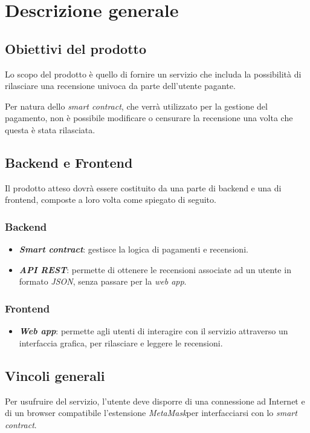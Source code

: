 \section{Descrizione generale}

    \subsection{Obiettivi del prodotto}
    Lo scopo del prodotto è quello di fornire un servizio che includa la possibilità di rilasciare una recensione univoca da parte dell'utente pagante.

    Per natura dello \textit{smart contract}\glo \:, che verrà utilizzato per la gestione del pagamento, non è possibile modificare o censurare la recensione una volta che questa è stata rilasciata.

    \subsection{Backend e Frontend}
    Il prodotto atteso dovrà essere costituito da una parte di backend e una di frontend, composte a loro volta come spiegato di seguito.

        \subsubsection{Backend}
        \begin{itemize}
            \item \textit{\textbf{Smart contract}}: gestisce la logica di pagamenti e recensioni.
            \item \textit{\textbf{API REST}}\glo : permette di ottenere le recensioni associate ad un utente in formato \textit{JSON}\glo , senza passare per la \textit{web app}.
        \end{itemize}

        \subsubsection{Frontend}
        \begin{itemize}
            \item \textit{\textbf{Web app}}: permette agli utenti di interagire con il servizio attraverso un interfaccia grafica, per rilasciare e leggere le recensioni.
        \end{itemize}
    \subsection{Vincoli generali}
    Per usufruire del servizio, l'utente deve disporre di una connessione ad Internet e di un browser compatibile l'estensione \textit{MetaMask}\glo\:per interfacciarsi con lo \textit{smart contract}.